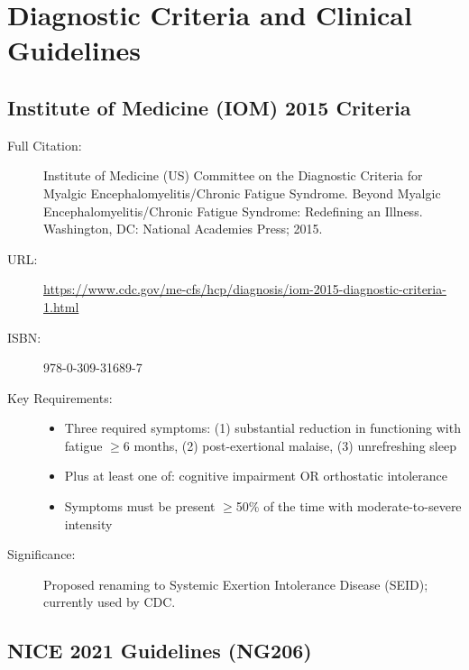 \section{Diagnostic Criteria and Clinical Guidelines}
\label{sec:bib-diagnostic-criteria}

\subsection{Institute of Medicine (IOM) 2015 Criteria}

\begin{description}
    \item[Full Citation:] Institute of Medicine (US) Committee on the Diagnostic Criteria for Myalgic Encephalomyelitis/Chronic Fatigue Syndrome. Beyond Myalgic Encephalomyelitis/Chronic Fatigue Syndrome: Redefining an Illness. Washington, DC: National Academies Press; 2015.
    \item[URL:] \url{https://www.cdc.gov/me-cfs/hcp/diagnosis/iom-2015-diagnostic-criteria-1.html}
    \item[ISBN:] 978-0-309-31689-7
    \item[Key Requirements:]
    \begin{itemize}
        \item Three required symptoms: (1) substantial reduction in functioning with fatigue $\geq$6 months, (2) post-exertional malaise, (3) unrefreshing sleep
        \item Plus at least one of: cognitive impairment OR orthostatic intolerance
        \item Symptoms must be present $\geq$50\% of the time with moderate-to-severe intensity
    \end{itemize}
    \item[Significance:] Proposed renaming to Systemic Exertion Intolerance Disease (SEID); currently used by CDC.
\end{description}

\subsection{NICE 2021 Guidelines (NG206)}

